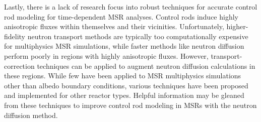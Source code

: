 Lastly, there is a lack of research focus into robust techniques for accurate control rod modeling
for time-dependent \gls{MSR} analyses. Control rods induce highly anisotropic fluxes within
themselves and their vicinities.
Unfortunately, higher-fidelity neutron transport methods are typically too computationally
expensive for multiphysics \gls{MSR} simulations, while faster methods like neutron
diffusion perform poorly in regions with highly anisotropic fluxes. However, transport-correction
techniques can be applied to augment neutron diffusion calculations in these regions. While few
have been applied to \gls{MSR} multiphysics simulations other than albedo boundary conditions,
various techniques have been proposed and implemented for other reactor types. Helpful information
may be gleaned from these techniques to improve control rod modeling in \glspl{MSR} with the
neutron diffusion method.

